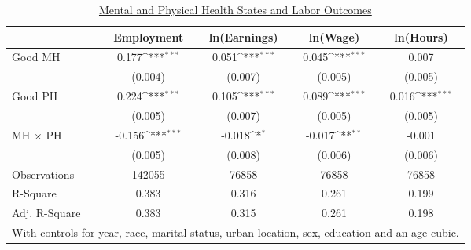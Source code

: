 \def\sym#1{\ifmmode^{#1}\else\(^{#1}\)\fi}
\begin{table}
\center\caption*{\large{\underline{Mental and Physical Health States and Labor Outcomes}}}
\vspace{0.2cm}
\begin{tabular}{l*{4}{c}}
                    &\multicolumn{1}{c}{Employment}&\multicolumn{1}{c}{ln(Earnings)}&\multicolumn{1}{c}{ln(Wage)}&\multicolumn{1}{c}{ln(Hours)}\\
\midrule
Good MH             &       0.177\sym{***}&       0.051\sym{***}&       0.045\sym{***}&       0.007         \\
                    &     (0.004)         &     (0.007)         &     (0.005)         &     (0.005)         \\
Good PH             &       0.224\sym{***}&       0.105\sym{***}&       0.089\sym{***}&       0.016\sym{***}\\
                    &     (0.005)         &     (0.007)         &     (0.005)         &     (0.005)         \\
MH $\times$ PH      &      -0.156\sym{***}&      -0.018\sym{*}  &      -0.017\sym{**} &      -0.001         \\
                    &     (0.005)         &     (0.008)         &     (0.006)         &     (0.006)         \\
\midrule
Observations        &      142055         &       76858         &       76858         &       76858         \\
R-Square            &       0.383         &       0.316         &       0.261         &       0.199         \\
Adj. R-Square       &       0.383         &       0.315         &       0.261         &       0.198         \\
\bottomrule
\multicolumn{5}{l}{\scriptsize{With controls for year, race, marital status, urban location, sex, education and an age cubic.}} \\
\end{tabular}
\end{table}

